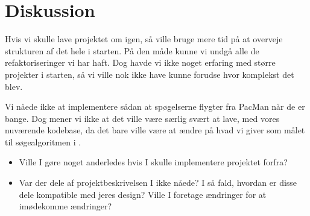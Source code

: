 \documentclass{article}
\newcommand{\class}[1]{\textcolor{BlueViolet}{\small\ttfamily\seqsplit{#1}}}
\theoremstyle{mytheoremstyle}
\theoremstyle{mytheoremstyle}
\theoremstyle{myproblemstyle}
\begin{document}

\section{Diskussion}\label{sec:Diskussion} %

Hvis vi skulle lave projektet om igen, så ville bruge mere tid på at overveje
strukturen af det hele i starten. På den måde kunne vi undgå alle de
refaktoriseringer vi har haft. Dog havde vi ikke noget erfaring med større
projekter i starten, så vi ville nok ikke have kunne forudse hvor komplekst det
blev.

Vi nåede ikke at implementere sådan at spøgelserne flygter fra PacMan når de er
bange. Dog mener vi ikke at det ville være særlig svært at lave, med vores
nuværende kodebase, da det bare ville være at ændre på hvad vi giver som målet
til søgealgoritmen i \class{GhostController}.

\begin{itemize}
  \item Ville I gøre noget anderledes hvis I skulle implementere projektet
  forfra?
  \item Var der dele af projektbeskrivelsen I ikke nåede? I så fald, hvordan er
  disse dele kompatible med jeres design? Ville I foretage ændringer for at
  imødekomme ændringer?
\end{itemize}

\newpage
\printbibliography
\end{document}
